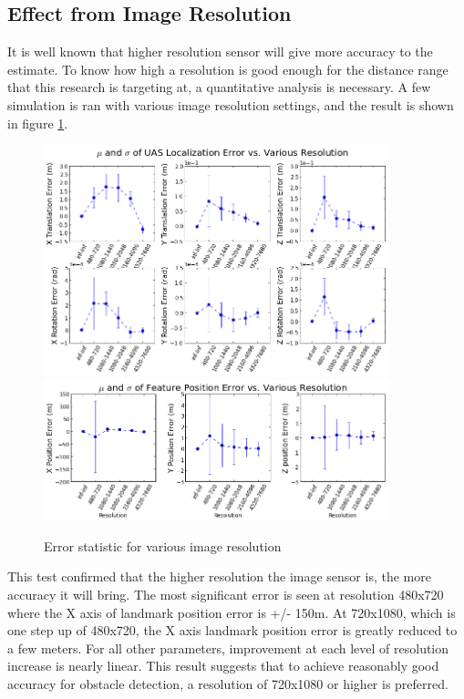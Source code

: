\FloatBarrier

\subsection{Effect from Image Resolution}

It is well known that higher resolution sensor will give more accuracy to the estimate. To know how high a resolution is good enough for the distance range that this research is targeting at, a quantitative analysis is necessary. A few simulation is ran with various image resolution settings, and the result is shown in figure \ref{fig:simfig50}. 

\begin{figure}[h] 
  \centering
  \includegraphics[width=10cm,keepaspectratio=true]{./Figures/SimulationFigures/Figure50.png}
  \includegraphics[width=10cm,keepaspectratio=true]{./Figures/SimulationFigures/Figure49.png}
  \caption{Error statistic for various image resolution}
  \label{fig:simfig50}
\end{figure}

This test confirmed that the higher resolution the image sensor is, the more accuracy it will bring. The most significant error is seen at resolution 480x720 where the X axis of landmark position error is +/- 150m. At 720x1080, which is one step up of 480x720, the X axis landmark position error is greatly reduced to a few meters. For all other parameters, improvement at each level of resolution increase is nearly linear. This result suggests that to achieve reasonably good accuracy for obstacle detection, a resolution of 720x1080 or higher is preferred. 


